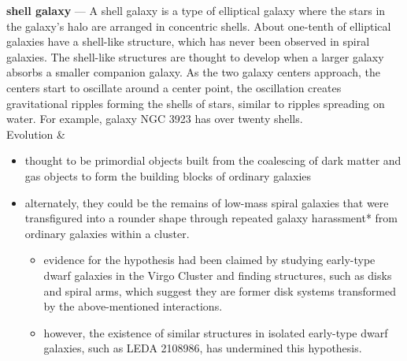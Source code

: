 \begin{longtabu}
 \textbf{shell galaxy} --- A shell galaxy is a type of elliptical galaxy where the stars in the galaxy's halo are arranged in concentric shells. About one-tenth of elliptical galaxies have a shell-like structure, which has never been observed in spiral galaxies. The shell-like structures are thought to develop when a larger galaxy absorbs a smaller companion galaxy. As the two galaxy centers approach, the centers start to oscillate around a center point, the oscillation creates gravitational ripples forming the shells of stars, similar to ripples spreading on water. For example, galaxy NGC 3923 has over twenty shells.
 \\
 \hline
 Evolution &
 \begin{itemize}[noitemsep]
 	\item thought to be primordial objects built from the coalescing of dark matter and gas objects to form the building blocks of ordinary galaxies
	\item alternately, they could be the remains of low-mass spiral galaxies that were transfigured into a rounder shape through repeated \gls{galaxy harassment}* from ordinary galaxies within a cluster. 
		\begin{itemize}[noitemsep]
			\item evidence for the hypothesis had been claimed by studying early-type dwarf galaxies in the Virgo Cluster and finding structures, such as disks and spiral arms, which suggest they are former disk systems transformed by the above-mentioned interactions. 
			\item however, the existence of similar structures in isolated early-type dwarf galaxies, such as LEDA 2108986, has undermined this hypothesis.
		\end{itemize}
\end{itemize}
\\
\hline
\end{longtabu}